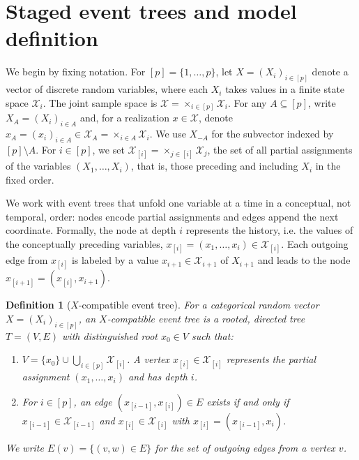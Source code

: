 \documentclass[preprint,12pt]{elsarticle}
\newtheorem{mydef}{Definition}
\begin{document}


\section{Staged event trees and model definition}
\label{sec:stagedtrees}

We begin by fixing notation. For $[p]=\{1,\ldots,p\}$, let $X=(X_i)_{i\in[p]}$ denote a vector of discrete random variables, where each $X_i$ takes values in a finite state space $\mathcal X_i$. The joint sample space is $\mathcal X=\times_{i\in[p]}\mathcal X_i$. For any $A\subseteq[p]$, write $X_A=(X_i)_{i\in A}$ and, for a realization $x\in\mathcal X$, denote $x_A=(x_i)_{i\in A}\in\mathcal X_A=\times_{i\in A}\mathcal X_i$. We use $X_{-A}$ for the subvector indexed by $[p]\setminus A$. For $i\in[p]$, we set $\mathcal X_{[i]}=\times_{j\in[i]}\mathcal X_j$, the set of all partial assignments of the variables $(X_1,\ldots,X_i)$, that is, those preceding and including $X_i$ in the fixed order. 

We work with event trees that unfold one variable at a time in a conceptual, not temporal, order: nodes encode partial assignments and edges append the next coordinate. Formally, the node at depth $i$ represents the history, i.e. the values of the conceptually preceding variables, $x_{[i]}=(x_1,\ldots,x_i)\in\mathcal X_{[i]}$. Each outgoing edge from $x_{[i]}$ is labeled by a value $x_{i+1}\in\mathcal X_{i+1}$ of $X_{i+1}$ and leads to the node $x_{[i+1]}=(x_{[i]},x_{i+1})$. 


\begin{mydef}[$X$-compatible event tree]
\label{def:x-compatible-event-tree}
For a categorical random vector $X=(X_i)_{i\in[p]}$, an \textnormal{$X$-compatible event tree} is a rooted, directed tree $T=(V,E)$ with distinguished root $x_0\in V$ such that:
\begin{enumerate}
\item $V=\{x_0\}\cup\bigcup_{i\in[p]}\mathcal X_{[i]}$. A vertex $x_{[i]}\in\mathcal X_{[i]}$ represents the partial assignment $(x_1,\ldots,x_i)$ and has depth $i$.
\item For $i\in[p]$, an edge $(x_{[i-1]},x_{[i]})\in E$ exists if and only if $x_{[i-1]}\in\mathcal X_{[i-1]}$ and $x_{[i]}\in\mathcal X_{[i]}$ with $x_{[i]}=(x_{[i-1]},x_i)$.
\end{enumerate}
We write $E(v)=\{(v,w)\in E\}$ for the set of outgoing edges from a vertex $v$.
\end{mydef}
\end{document}
